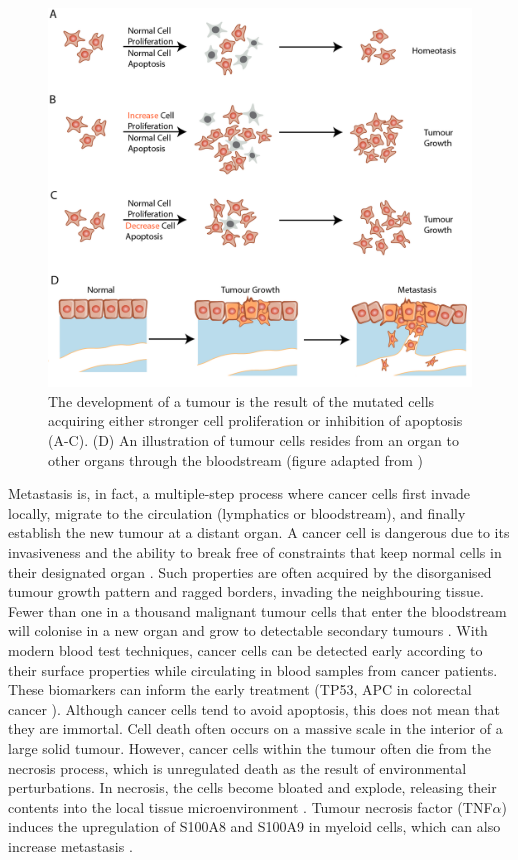 \begin{figure}[htp]
    \centering
    \includegraphics[width=0.7\columnwidth]{Chapter1/Figures/Chap1_figure3.png}
    \caption[Tumorigenesis and metastasis process. ]{The development of a tumour is the result of the mutated cells acquiring either stronger cell proliferation or inhibition of apoptosis (A-C). (D) An illustration of tumour cells resides from an organ to other organs through the bloodstream (figure adapted from \cite{alberts2018molecular})}
    \label{fig:Chap1_figure3}
\end{figure}

Metastasis is, in fact, a multiple-step process where cancer cells first invade locally, migrate to the circulation (lymphatics or bloodstream), and finally establish the new tumour at a distant organ. A cancer cell is dangerous due to its invasiveness and the ability to break free of constraints that keep normal cells in their designated organ \cite{greaves2012clonal}. Such properties are often acquired by the disorganised tumour growth pattern and ragged borders, invading the neighbouring tissue. Fewer than one in a thousand malignant tumour cells that enter the bloodstream will colonise in a new organ and grow to detectable secondary tumours \cite{joyce2009microenvironmental}. With modern blood test techniques, cancer cells can be detected early according to their surface properties while circulating in blood samples from cancer patients. These biomarkers can inform the early treatment (\ie TP53, APC in colorectal cancer \cite{markowitz2009molecular}). Although cancer cells tend to avoid apoptosis, this does not mean that they are immortal. Cell death often occurs on a massive scale in the interior of a large solid tumour. However, cancer cells within the tumour often die from the necrosis process, which is unregulated death as the result of environmental perturbations. In necrosis, the cells become bloated and explode, releasing their contents into the local tissue microenvironment \cite{hanahan2011hallmarksnext}. Tumour necrosis factor (TNF$\alpha$) induces the upregulation of S100A8 and S100A9 in myeloid cells, which can also increase metastasis \cite{hiratsuka2008s100a8, hiratsuka2006tumour}. 

